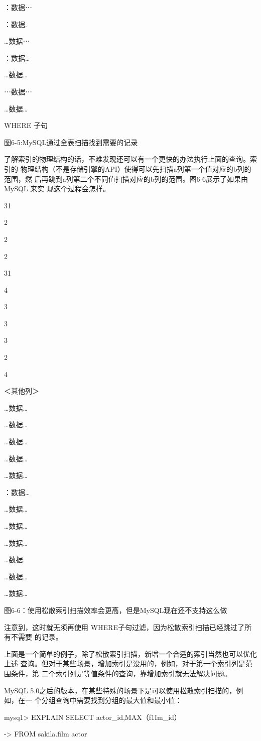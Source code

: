 ：数据⋯

：数据.

…数据⋯

：数据…

…数据…

⋯数据⋯

…数据…

WHERE 子句

图6-5:MySQL通过全表扫描找到需要的记录

了解索引的物理结构的话，不难发现还可以有一个更快的办法执行上面的查询。索引的
物理结构（不是存储引擎的API）使得可以先扫描a列第一个值对应的b列的范围，然
后再跳到a列第二个不同值扫描对应的b列的范围。图6-6展示了如果由MySQL 来实
现这个过程会怎样。

31

2

2

2

31

4

3

3

3

2

4

＜其他列＞

…数据…

…数据…

…数据…

…数据…

…数据…

：数据…

…数据…

…数据…

…数据…

…数据.

…数据…

…数据…

图6-6：使用松散索引扫描效率会更高，但是MySQL现在还不支持这么做

注意到，这时就无须再使用 WHERE子句过滤，因为松散索引扫描已经跳过了所有不需要
的记录。

上面是一个简单的例子，除了松散索引扫描，新增一个合适的索引当然也可以优化上述
查询。但对于某些场景，增加索引是没用的，例如，对于第一个索引列是范围条件，第
二个索引列是等值条件的查询，靠增加索引就无法解决问题。

MySQL 5.0之后的版本，在某些特殊的场景下是可以使用松散索引扫描的，例如，在一
个分组查询中需要找到分组的最大值和最小值：

mysq1> EXPLAIN SELECT actor\_id,MAX（f1Im\_id）

-> FROM sakila.film actor


